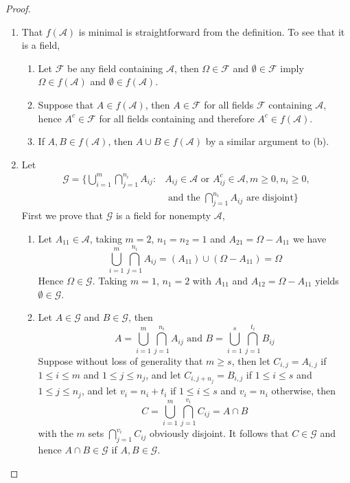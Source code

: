 \documentclass[12pt]{article}
\newcommand{\F}{\mathcal{F}}
\newcommand{\A}{\mathcal{A}}
\newcommand{\G}{\mathcal{G}}
\newcommand{\Om}{\Omega}
\newcommand{\es}{\emptyset}
\newcommand{\un}{\cup}
\newcommand{\ic}{\cap}
\begin{document}
\begin{proof}
    \begin{enumerate}
        \item That $f(\A)$ is minimal is straightforward from the definition. To see that it is a field,
        \begin{enumerate}
            \item Let $\F$ be any field containing $\A$, then $\Om \in \F$ and $\es \in \F$ imply $\Om \in f(\A)$ and $\es \in f(\A)$.
            \item Suppose that $A \in f(\A)$, then $A \in \F$ for all fields $\F$ containing $\A$, hence $A^{c} \in \F$ for all fields containing and therefore $A^{c} \in f(\A)$.
            \item If $A, B \in f(\A)$, then $A \un B \in f(\A)$ by a similar argument to (b).
        \end{enumerate}
        \item Let 
        \begin{align*}
            \G = \Big \{ \bigcup_{i=1}^{m} \bigcap_{j=1}^{n_i} A_{ij} : & A_{ij} \in \A \text { or } A_{ij}^{c} \in \A, m \geq 0, n_i \geq 0, \\
            & \text { and the }  \bigcap_{j=1}^{n_i} A_{ij} \text { are disjoint} \Big \}
        \end{align*}
        First we prove that $\G$ is a field for nonempty $\A$,
        \begin{enumerate}
            \item Let $A_{11} \in \A$, taking $m=2$, $n_1 = n_2 = 1$ and $A_{21} = \Om - A_{11}$ we have
            \[ \bigcup_{i=1}^{m} \bigcap_{j=1}^{n_i} A_{ij} = (A_{11}) \un (\Om - A_{11}) = \Om \]
            Hence $\Om \in \G$. Taking $m=1$, $n_1 = 2$ with $A_{11}$ and $A_{12} = \Om - A_{11}$ yields $\es \in \G$.
            \item Let $A \in \G$ and $B \in \G$, then
            \[ A = \bigcup_{i=1}^{m} \bigcap_{j=1}^{n_i} A_{ij} \text { and } B = \bigcup_{i=1}^{s} \bigcap_{j=1}^{t_i} B_{ij} \]
            Suppose without loss of generality that $m \geq s$, then let $C_{i,j} = A_{i,j}$ if $1 \leq i \leq m$ and $1 \leq j \leq n_j$, and let $C_{i, j+n_j} = B_{i, j}$ if $1 \leq i \leq s$ and $1 \leq j \leq n_j$, and let $v_i = n_i + t_i$ if $1 \leq i \leq s$ and $v_i = n_i$ otherwise, then 
            \[ C = \bigcup_{i=1}^{m} \bigcap_{j=1}^{v_i} C_{ij} = A \ic B \]
            with the $m$ sets $\bigcap_{j=1}^{v_i} C_{ij}$ obviously disjoint. It follows that $C \in \G$ and hence $A \ic B \in \G$ if $A, B \in \G$.

\end{enumerate}
\end{enumerate}
\end{proof}
\end{document}
